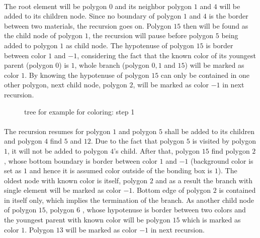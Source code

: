 \paragraph{}
The root element will be polygon $0$ and its neighbor polygon $1$ and $4$ will be added to its children node.
Since no boundary of polygon $1$ and $4$ is the border between two materials, the recursion goes on.
Polygon $15$ then will be found as the child node of polygon $1$, the recursion will pause before polygon $5$ being added to polygon $1$ as child node.
The hypotenuse of polygon $15$ is border between color $1$ and $-1$, considering the fact that the known color of its youngest parent (polygon $0$) is $1$, whole branch (polygon $0,1$ and $15$) will be marked as color $1$.
By knowing the hypotenuse of polygon $15$ can only be contained in one other polygon, next child node, polygon $2$, will be marked as color $-1$ in next recursion.
    \begin{figure}[h!]
        \centering
        \caption[Tree for example for coloring: step 1]{tree for example for coloring: step 1}
        \label{qdt_fig:qdt_color_tree_0}
    \end{figure}

\paragraph{}
The recursion resumes for polygon $1$ and polygon $5$ shall be added to its children and polygon $4$ find $5$ and $12$.
Due to the fact that polygon $5$ is visited by polygon $1$, it will not be added to polygon $4$'s child.
After that, polygon $15$ find polygon $2$, whose bottom boundary is border between color $1$ and $-1$ (background color is set as $1$ and hence it is assumed color outside of the bonding box is $1$).
The oldest node with known color is itself, polygon $2$ and as a result the branch with single element will be marked as color $-1$.
Bottom edge of polygon $2$ is contained in itself only, which implies the termination of the branch.
As another child node of polygon $15$, polygon $6$ , whose hypotenuse is border between two colors and the youngest parent with known color will be polygon $15$ which is marked as color $1$.
Polygon $13$ will be marked as color $-1$ in next recursion.

